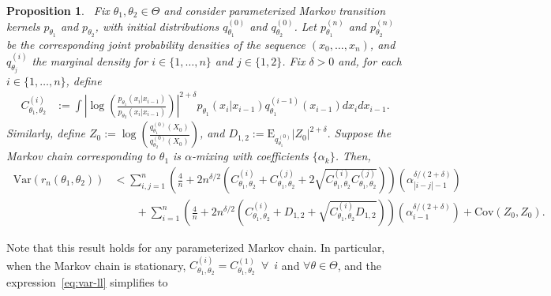 \documentclass[11pt]{amsart}
\newcommand{\E}{\mathrm{E}}
\newcommand{\Var}{\mathrm{Var}}
\newcommand{\Cov}{\mathrm{Cov}}
\newtheorem{proposition}{Proposition}[section]
\begin{document}
\begin{proposition}~\label{prop:2}
Fix $\theta_1,\theta_2 \in \Theta$ and consider parameterized Markov transition kernels $p_{\theta_1}$ and $p_{\theta_2}$, with initial distributions $q^{(0)}_{\theta_1}$ and $q^{(0)}_{\theta_2}$. Let $p_{\theta_1}^{(n)}$ and $p_{\theta_2}^{(n)}$ be the corresponding joint probability densities of the sequence $(x_0,\dotsc,x_n)$, and $q^{(i)}_{\theta_j}$ the marginal density for $i \in \{1,\ldots,n\}$ and $j \in \{1,2\}$. Fix $\delta>0$ and, for each $i\in \{1,\dots,n\}$, define
\begin{align*}
C_{\theta_1,\theta_2}^{(i)} &:= \int\left|\log\left(\frac{ p_{\theta_1}(x_i|x_{i-1}) } { p_{\theta_2}(x_i|x_{i-1}) }\right)\right|^{2+\delta} p_{\theta_1}(x_i| x_{i-1}) q^{(i-1)}_{\theta_1}(x_{i-1}) dx_i dx_{i-1}.
\end{align*}
Similarly, define $Z_0 := \log\left(\frac{q^{(0)}_{\theta_1}(X_0)}{q^{(0)}_{\theta_2}(X_0)}\right)$, and
$    D_{1,2} := \E_{q_{\theta_1}^{(0)}}\left|Z_0\right|^{2+\delta}.$
Suppose the Markov chain corresponding to $\theta_1$ is $\alpha$-mixing with coefficients $\{\alpha_k\}$. Then,
\begin{align}~\label{eq:var-ll}
\nonumber
    \Var \left( r_n(\theta_1,\theta_2) \right) & < \sum_{i,j=1}^n\left(\frac{4}{n}+2n^{\delta/2}(C_{\theta_1,\theta_2}^{(i)}+C_{\theta_1,\theta_2}^{(j)}+2\sqrt{C_{\theta_1,\theta_2}^{(i)}C_{\theta_1,\theta_2}^{(j)}})\right)  \left(\alpha_{|i-j|-1}^{\delta/(2+\delta)}\right)\\
    &\qquad+ \sum_{i=1}^n\left(\frac{4}{n}+2n^{\delta/2}(C_{\theta_1,\theta_2}^{(i)}+D_{1,2}+\sqrt{C_{\theta_1,\theta_2}^{(i)}D_{1,2}})\right)\left(\alpha_{i-1}^{\delta/(2+\delta)}\right) + \Cov(Z_0,Z_0).
\end{align}
\end{proposition}
Note that this result holds for any parameterized Markov chain. In particular, when the Markov chain is stationary, $C_{\theta_1,\theta_2}^{(i)}=C_{\theta_1,\theta_2}^{(1)}\enspace\forall\enspace i$ and $\forall \theta \in \Theta$, and the expression~\cref{eq:var-ll} simplifies to
\end{document}
